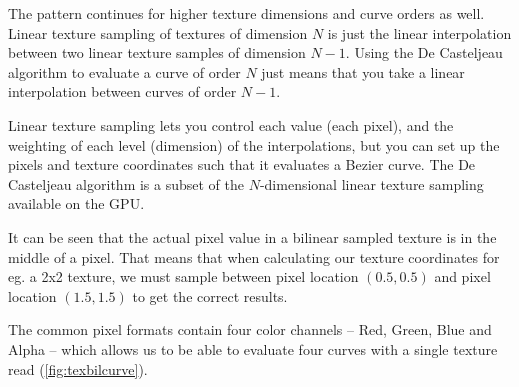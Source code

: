 \documentclass{jcgt}
\begin{document}
The pattern continues for higher texture dimensions and curve orders as well.  Linear texture sampling of textures of dimension $N$ is just the linear interpolation between two linear texture samples of dimension $N-1$.  Using the De Casteljeau algorithm to evaluate a curve of order $N$ just means that you take a linear interpolation between curves of order $N-1$.

Linear texture sampling lets you control each value (each pixel), and the weighting of each level (dimension) of the interpolations, but you can set up the pixels and texture coordinates such that it evaluates a Bezier curve.  The De Casteljeau algorithm is a subset of the $N$-dimensional linear texture sampling available on the GPU.

It can be seen that the actual pixel value in a bilinear sampled texture is in the middle of a pixel.  That means that when calculating our texture coordinates for eg. a 2x2 texture, we must sample between pixel location $(0.5,0.5)$ and pixel location $(1.5,1.5)$ to get the correct results.

The common pixel formats contain four color channels – Red, Green, Blue and Alpha – which allows us to be able to evaluate four curves with a single texture read (\autoref{fig:texbilcurve}).
\end{document}
